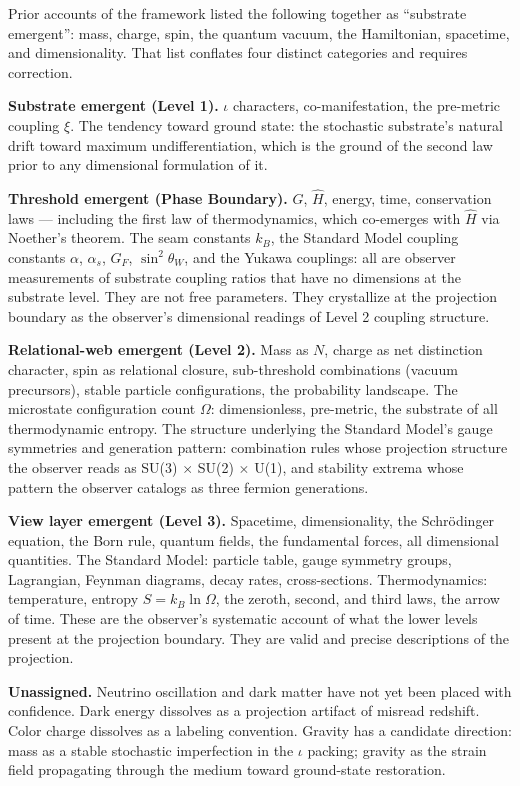 \documentclass[11pt,letterpaper]{article}
\begin{document}
Prior accounts of the framework listed the following together as ``substrate emergent'': mass, charge, spin, the quantum vacuum, the Hamiltonian, spacetime, and dimensionality. That list conflates four distinct categories and requires correction.

\textbf{Substrate emergent (Level 1).} \(\iota\) characters, co-manifestation, the pre-metric coupling \(\xi\). The tendency toward ground state: the stochastic substrate's natural drift toward maximum undifferentiation, which is the ground of the second law prior to any dimensional formulation of it.

\textbf{Threshold emergent (Phase Boundary).} \(G\), \(\hat{H}\), energy, time, conservation laws --- including the first law of thermodynamics, which co-emerges with \(\hat{H}\) via Noether's theorem. The seam constants \(k_B\), the Standard Model coupling constants \(\alpha\), \(\alpha_s\), \(G_F\), \(\sin^2\theta_W\), and the Yukawa couplings: all are observer measurements of substrate coupling ratios that have no dimensions at the substrate level. They are not free parameters. They crystallize at the projection boundary as the observer's dimensional readings of Level 2 coupling structure.

\textbf{Relational-web emergent (Level 2).} Mass as \(N\), charge as net distinction character, spin as relational closure, sub-threshold combinations (vacuum precursors), stable particle configurations, the probability landscape. The microstate configuration count \(\Omega\): dimensionless, pre-metric, the substrate of all thermodynamic entropy. The structure underlying the Standard Model's gauge symmetries and generation pattern: combination rules whose projection structure the observer reads as SU(3) \(\times\) SU(2) \(\times\) U(1), and stability extrema whose pattern the observer catalogs as three fermion generations.

\textbf{View layer emergent (Level 3).} Spacetime, dimensionality, the Schrödinger equation, the Born rule, quantum fields, the fundamental forces, all dimensional quantities. The Standard Model: particle table, gauge symmetry groups, Lagrangian, Feynman diagrams, decay rates, cross-sections. Thermodynamics: temperature, entropy \(S = k_B \ln\Omega\), the zeroth, second, and third laws, the arrow of time. These are the observer's systematic account of what the lower levels present at the projection boundary. They are valid and precise descriptions of the projection.

\textbf{Unassigned.} Neutrino oscillation and dark matter have not yet been placed with confidence. Dark energy dissolves as a projection artifact of misread redshift. Color charge dissolves as a labeling convention. Gravity has a candidate direction: mass as a stable stochastic imperfection in the \(\iota\) packing; gravity as the strain field propagating through the medium toward ground-state restoration.
\end{document}
